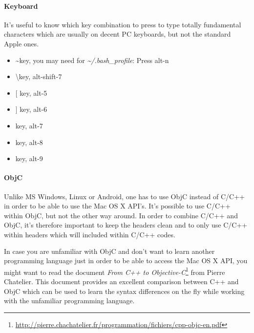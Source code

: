\paragraph{Keyboard}
It's useful to know which key combination to press to type totally fundamental characters which are usually on decent PC keyboards, but not the standard Apple ones.

\begin{itemize}
	\item \textasciitilde key, you may need for \emph{\textasciitilde /.bash\_profile}: Press alt-n
	\item \textbackslash key, alt-shift-7
	\item $[$ key, alt-5
	\item $]$ key, alt-6
	\item \textbar key, alt-7
	\item \textbraceleft key, alt-8
	\item \textbraceright key, alt-9
\end{itemize}


\paragraph{ObjC}
Unlike MS Windows, Linux or Android, one has to use ObjC instead of C/C++ in order to be able to use the Mac OS X API's. It's possible to use C/C++ within ObjC, but not the other way around. In order to combine C/C++ and ObjC, it's therefore important to keep the headers clean and to only use C/C++ within headers which will included within C/C++ codes.

In case you are unfamiliar with ObjC and don't want to learn another programming language just in order to be able to access the Mac OS X API, you might want to read the document \emph{From C++ to Objective-C}\footnote{\url{http://pierre.chachatelier.fr/programmation/fichiers/cpp-objc-en.pdf}} from Pierre Chatelier. This document provides an excellent comparison between C++ and ObjC which can be used to learn the syntax differences on the fly while working with the unfamiliar programming language.
